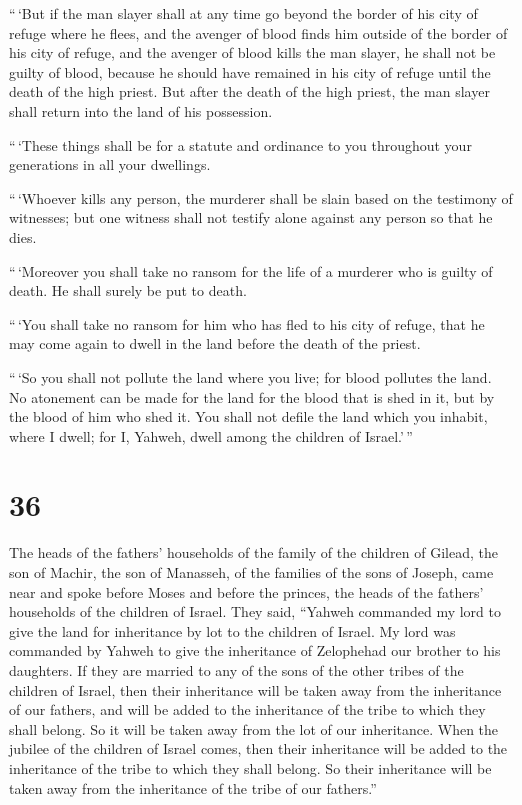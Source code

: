  ``\,`But if the man slayer shall at any time go beyond the
border of his city of refuge where he flees,  and the
avenger of blood finds him outside of the border of his city of refuge,
and the avenger of blood kills the man slayer, he shall not be guilty of
blood,  because he should have remained in his city of
refuge until the death of the high priest. But after the death of the
high priest, the man slayer shall return into the land of his
possession.

 ``\,`These things shall be for a statute and ordinance to
you throughout your generations in all your dwellings.

 ``\,`Whoever kills any person, the murderer shall be slain
based on the testimony of witnesses; but one witness shall not testify
alone against any person so that he dies.

 ``\,`Moreover you shall take no ransom for the life of a
murderer who is guilty of death. He shall surely be put to death.

 ``\,`You shall take no ransom for him who has fled to his
city of refuge, that he may come again to dwell in the land before the
death of the priest.

 ``\,`So you shall not pollute the land where you live; for
blood pollutes the land. No atonement can be made for the land for the
blood that is shed in it, but by the blood of him who shed it.
 You shall not defile the land which you inhabit, where I
dwell; for I, Yahweh, dwell among the children of Israel.'\,''

\hypertarget{section-35}{%
\section{36}\label{section-35}}

 The heads of the fathers' households of the family of the
children of Gilead, the son of Machir, the son of Manasseh, of the
families of the sons of Joseph, came near and spoke before Moses and
before the princes, the heads of the fathers' households of the children
of Israel.  They said, ``Yahweh commanded my lord to give
the land for inheritance by lot to the children of Israel. My lord was
commanded by Yahweh to give the inheritance of Zelophehad our brother to
his daughters.  If they are married to any of the sons of
the other tribes of the children of Israel, then their inheritance will
be taken away from the inheritance of our fathers, and will be added to
the inheritance of the tribe to which they shall belong. So it will be
taken away from the lot of our inheritance.  When the
jubilee of the children of Israel comes, then their inheritance will be
added to the inheritance of the tribe to which they shall belong. So
their inheritance will be taken away from the inheritance of the tribe
of our fathers.''

